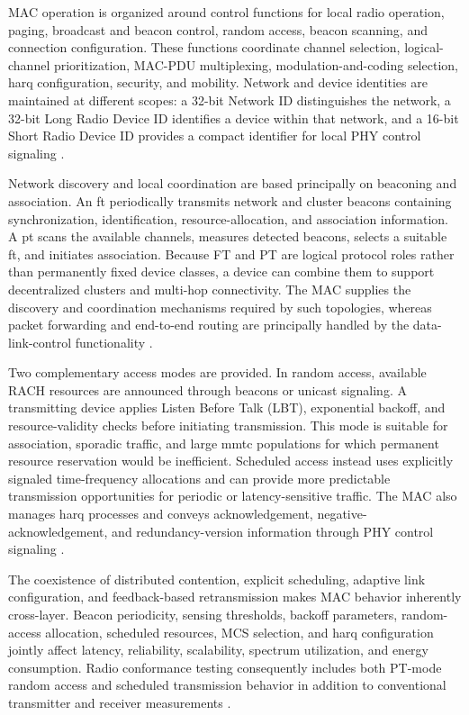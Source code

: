 MAC operation is organized around control functions for local radio operation,
paging, broadcast and beacon control, random access, beacon scanning, and
connection configuration. These functions coordinate channel selection,
logical-channel prioritization, MAC-PDU multiplexing, modulation-and-coding
selection, \gls{harq} configuration, security, and mobility. Network and
device identities are maintained at different scopes: a 32-bit Network ID
distinguishes the network, a 32-bit Long Radio Device ID identifies a device
within that network, and a 16-bit Short Radio Device ID provides a compact
identifier for local PHY control signaling
\cite{etsi_ts_103636_4_r2}.

Network discovery and local coordination are based principally on beaconing
and association. An \gls{ft} periodically transmits network and cluster
beacons containing synchronization, identification, resource-allocation, and
association information. A \gls{pt} scans the available channels, measures
detected beacons, selects a suitable \gls{ft}, and initiates association.
Because FT and PT are logical protocol roles rather than permanently fixed
device classes, a device can combine them to support decentralized clusters
and multi-hop connectivity. The MAC supplies the discovery and coordination
mechanisms required by such topologies, whereas packet forwarding and
end-to-end routing are principally handled by the data-link-control
functionality
\cite{etsi_ts103636_1,etsi_ts103636_4,
etsi_ts_103636_1_r2,etsi_ts_103636_4_r2}.

Two complementary access modes are provided. In random access, available RACH
resources are announced through beacons or unicast signaling. A transmitting
device applies Listen Before Talk (LBT), exponential backoff, and
resource-validity checks before initiating transmission. This mode is suitable
for association, sporadic traffic, and large \gls{mmtc} populations for which
permanent resource reservation would be inefficient. Scheduled access instead
uses explicitly signaled time-frequency allocations and can provide more
predictable transmission opportunities for periodic or latency-sensitive
traffic. The MAC also manages \gls{harq} processes and conveys
acknowledgement, negative-acknowledgement, and redundancy-version information
through PHY control signaling
\cite{etsi_ts103636_4,etsi_ts_103636_4_r2}.

The coexistence of distributed contention, explicit scheduling, adaptive link
configuration, and feedback-based retransmission makes MAC behavior
inherently cross-layer. Beacon periodicity, sensing thresholds, backoff
parameters, random-access allocation, scheduled resources, MCS selection, and
\gls{harq} configuration jointly affect latency, reliability, scalability,
spectrum utilization, and energy consumption. Radio conformance testing
consequently includes both PT-mode random access and scheduled transmission
behavior in addition to conventional transmitter and receiver measurements
\cite{etsi_ts_103776}.

